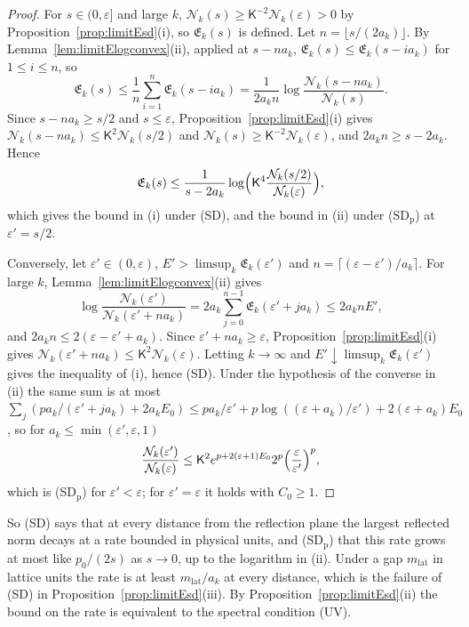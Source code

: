 \documentclass[aps,prd,twocolumn,superscriptaddress,nofootinbib,longbibliography,floatfix,amsmath,amssymb,10pt]{revtex4-2}
\theoremstyle{definition}
\theoremstyle{remark}
\begin{document}
\begin{proof}
For $s\in(0,\varepsilon]$ and large $k$, $\mathcal N_k(s)\ge\mathsf K^{-2}
\mathcal N_k(\varepsilon)>0$ by Proposition~\ref{prop:limitEsd}(i), so
$\mathfrak E_k(s)$ is defined. Let $n=\lfloor s/(2a_k)\rfloor$. By
Lemma~\ref{lem:limitElogconvex}(ii), applied at $s-na_k$,
$\mathfrak E_k(s)\le\mathfrak E_k(s-ia_k)$ for $1\le i\le n$, so
\[
\mathfrak E_k(s)\le\frac1n\sum_{i=1}^n\mathfrak E_k(s-ia_k)=\frac1{2a_kn}
\log\frac{\mathcal N_k(s-na_k)}{\mathcal N_k(s)} .
\]
Since $s-na_k\ge s/2$ and $s\le\varepsilon$,
Proposition~\ref{prop:limitEsd}(i) gives $\mathcal N_k(s-na_k)\le\mathsf
K^2\mathcal N_k(s/2)$ and $\mathcal N_k(s)\ge\mathsf K^{-2}\mathcal
N_k(\varepsilon)$, and $2a_kn\ge s-2a_k$. Hence
\[
\mathfrak E_k(s)\le\frac1{s-2a_k}\log\Bigl(\mathsf K^4\frac{\mathcal
N_k(s/2)}{\mathcal N_k(\varepsilon)}\Bigr),
\]
which gives the bound in (i) under (SD), and the bound in (ii) under
(SD$_{\mathrm p}$) at $\varepsilon'=s/2$.

Conversely, let $\varepsilon'\in(0,\varepsilon)$, $E'>\limsup_k\mathfrak
E_k(\varepsilon')$ and $n=\lceil(\varepsilon-\varepsilon')/a_k\rceil$. For
large $k$, Lemma~\ref{lem:limitElogconvex}(ii) gives
\[
\log\frac{\mathcal N_k(\varepsilon')}{\mathcal N_k(\varepsilon'+na_k)}=
2a_k\sum_{j=0}^{n-1}\mathfrak E_k(\varepsilon'+ja_k)\le2a_knE' ,
\]
and $2a_kn\le2(\varepsilon-\varepsilon'+a_k)$. Since $\varepsilon'+na_k\ge
\varepsilon$, Proposition~\ref{prop:limitEsd}(i) gives $\mathcal
N_k(\varepsilon'+na_k)\le\mathsf K^2\mathcal N_k(\varepsilon)$. Letting
$k\to\infty$ and $E'\downarrow\limsup_k\mathfrak E_k(\varepsilon')$ gives
the inequality of (i), hence (SD). Under the hypothesis of the converse in
(ii) the same sum is at most $\sum_j(pa_k/(\varepsilon'+ja_k)+2a_kE_0)\le
pa_k/\varepsilon'+p\log((\varepsilon+a_k)/\varepsilon')+2(\varepsilon+
a_k)E_0$, so for $a_k\le\min(\varepsilon',\varepsilon,1)$
\[
\frac{\mathcal N_k(\varepsilon')}{\mathcal N_k(\varepsilon)}\le\mathsf
K^2e^{p+2(\varepsilon+1)E_0}2^p\Bigl(\frac\varepsilon{\varepsilon'}
\Bigr)^p ,
\]
which is (SD$_{\mathrm p}$) for $\varepsilon'<\varepsilon$; for
$\varepsilon'=\varepsilon$ it holds with $C_0\ge1$.
\end{proof}

So (SD) says that at every distance from the reflection plane the largest
reflected norm decays at a rate bounded in physical units, and
(SD$_{\mathrm p}$) that this rate grows at most like $p_0/(2s)$ as $s\to0$,
up to the logarithm in (ii). Under a gap $m_{\mathrm{lat}}$ in lattice units
the rate is at least $m_{\mathrm{lat}}/a_k$ at every distance, which is the
failure of (SD) in Proposition~\ref{prop:limitEsd}(iii). By
Proposition~\ref{prop:limitEsd}(ii) the bound on the rate is equivalent to
the spectral condition (UV).
\end{document}
